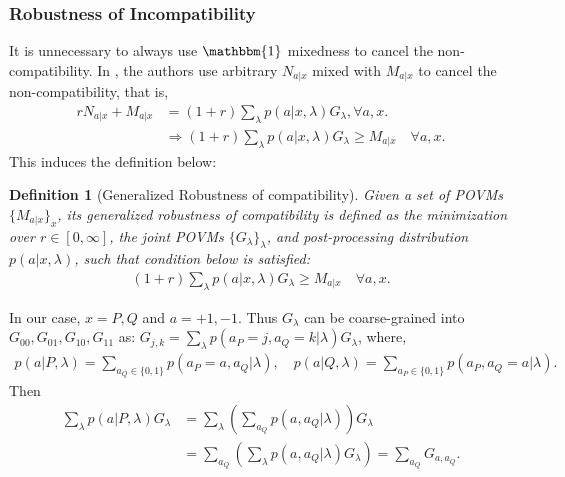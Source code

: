 \documentclass[aps,%
twocolumn,%
floatfix,%
pra,%
amsfonts,%
groupedaddress,%
superscriptaddress]{revtex4-2}%
\newtheorem{definition}{Definition}[section]
\newcommand{\1}{\mathbbm{1}}
\begin{document}
\subsubsection{Robustness of Incompatibility}
It is unnecessary to always use $\1$ mixedness to cancel the non-compatibility. In \cite{skrzypczyk2019all}, the authors use arbitrary $N_{a|x}$ mixed with $M_{a|x}$ to cancel the non-compatibility, that is, 
\begin{align}
    r N_{a|x} + M_{a|x} &= (1 + r)\sum_{\lambda} p(a|x,\lambda) G_\lambda, \forall a,x.\\
     &\Rightarrow (1 + r)\sum_{\lambda} p(a|x,\lambda) G_\lambda \geq M_{a|x} \quad \forall a,x.
\end{align}
This induces the definition below:

\begin{definition}[Generalized Robustness of compatibility]\label{def:generalized_robustness}
    Given a set of POVMs $\{M_{a|x}\}_{x}$, its generalized robustness of compatibility is defined as the minimization over $r \in [0,\infty]$, the joint POVMs $ \{G_{\lambda}\}_{\lambda}$, and post-processing distribution $p(a|x,\lambda)$, such that condition below is satisfied:
\begin{align}
    (1 + r)\sum_{\lambda} p(a|x,\lambda) G_\lambda \geq M_{a|x} \quad \forall a,x.
\end{align}
\end{definition}

In our case, $x = P,Q$ and $a = +1,-1$. Thus $G_{\lambda}$ can be coarse-grained into $G_{00}, G_{01}, G_{10}, G_{11}$ as: $G_{j,k} = \sum_\lambda p(a_P=j, a_Q=k | \lambda) G_\lambda$, where,
\begin{align*}
p(a|P, \lambda) = \sum_{a_Q \in \{0, 1\}} p(a_P = a, a_Q | \lambda),  \quad p(a|Q, \lambda) = \sum_{a_P \in \{0, 1\}} p(a_P, a_Q = a | \lambda).
\end{align*}
Then
\begin{align*}
\sum_\lambda p(a|P, \lambda) G_\lambda &= \sum_\lambda \left( \sum_{a_Q} p(a, a_Q | \lambda) \right) G_\lambda \\
&= \sum_{a_Q} \left( \sum_\lambda p(a, a_Q | \lambda) G_\lambda \right) = \sum_{a_Q} G_{a, a_Q}.
\end{align*}
\end{document}
